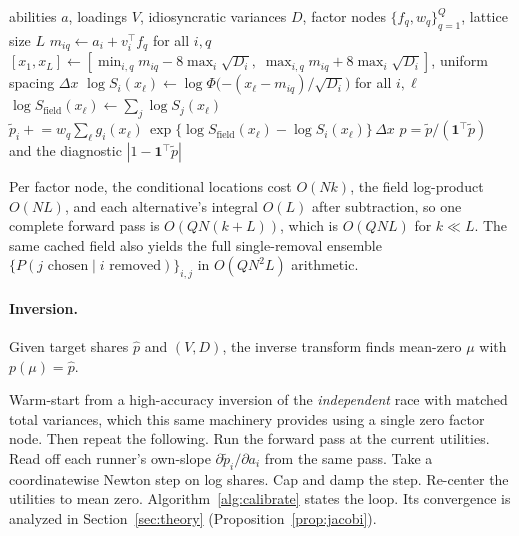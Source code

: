 \documentclass[12pt]{article}
\theoremstyle{remark}
\begin{document}
\begin{algorithm}[H]
\caption{All-share forward pass (min-wins; reflected from argmax by $a = -\mu$)}
\label{alg:forward}
\begin{algorithmic}[1]
\Require abilities $a$, loadings $V$, idiosyncratic variances $D$, factor
nodes $\{f_q, w_q\}_{q=1}^{Q}$, lattice size $L$
\State $m_{iq} \gets a_i + v_i^\top f_q$ for all $i, q$
\State $[x_1, x_L] \gets [\min_{i,q} m_{iq} - 8\max_i \sqrt{D_i},\;
\max_{i,q} m_{iq} + 8\max_i \sqrt{D_i}]$, uniform spacing $\Delta x$
  \State $\log S_i(x_\ell) \gets \log\Phi\big({-(x_\ell -
  m_{iq})}/{\sqrt{D_i}}\big)$ for all $i, \ell$
  \State $\log S_{\mathrm{field}}(x_\ell) \gets \sum_j \log
  S_j(x_\ell)$
  \State $\tilde p_i \mathrel{+}= w_q \sum_\ell g_i(x_\ell)\,
  \exp\{\log S_{\mathrm{field}}(x_\ell) - \log S_i(x_\ell)\}\,
  \Delta x$ 
\EndFor
\State \Return $p = \tilde p / (\mathbf{1}^\top \tilde p)$ and the
diagnostic $|1 - \mathbf{1}^\top \tilde p|$
\end{algorithmic}
\end{algorithm}

Per factor node, the conditional
locations cost $O(Nk)$, the field log-product $O(NL)$, and each
alternative's integral $O(L)$ after subtraction, so one complete forward
pass is $O(QN(k+L))$, which is $O(QNL)$ for $k \ll L$. The same cached
field also yields the full single-removal ensemble $\{P(j \text{ chosen}
\mid i \text{ removed})\}_{i,j}$ in $O(QN^2L)$ arithmetic.

\paragraph{Inversion.} Given target shares $\hat p$ and $(V, D)$, the
inverse transform finds mean-zero $\mu$ with $p(\mu) = \hat p$.

Warm-start from a high-accuracy inversion of
the \emph{independent} race with matched total variances, which this
same machinery provides using a single zero factor node. Then repeat the following. Run
the forward pass at the current utilities. Read off each runner's
own-slope $\partial \tilde p_i / \partial a_i$ from the same pass. Take a coordinatewise Newton step on log
shares. Cap and damp the step. Re-center the utilities to mean zero.
Algorithm~\ref{alg:calibrate} states the loop. Its convergence is
analyzed in Section~\ref{sec:theory} (Proposition~\ref{prop:jacobi}).
\end{document}
